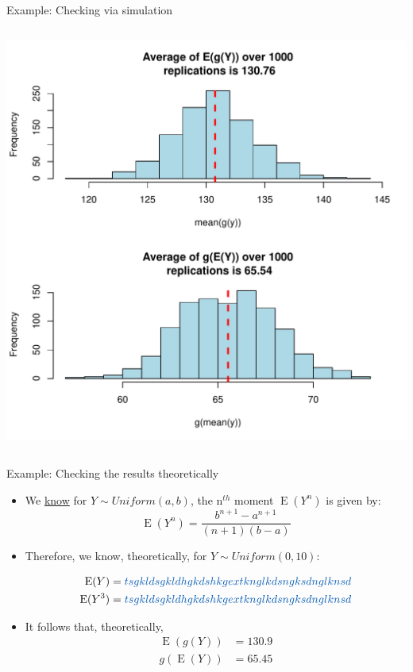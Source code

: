 \documentclass[10pt]{beamer}\usepackage[]{graphicx}\usepackage[]{color}
\makeatletter
\def\maxwidth{ %
  \ifdim\Gin@nat@width>\linewidth
    \linewidth
  \else
    \Gin@nat@width
  \fi
}
\newenvironment{knitrout}{}{} %
\newcommand{\Expec}{\operatorname{E}}
\makeatother
\begin{document}
\begin{frame}[fragile]{Example: Checking via simulation}
\begin{columns}
\begin{column}{0.5\textwidth}
\begin{knitrout}
{\centering \includegraphics[width=\maxwidth]{figure/unnamed-chunk-5-1} 

}


\end{knitrout}
\end{column}
\end{columns}
\end{frame}


\begin{frame}[fragile]{Example: Checking the results theoretically}
	\begin{itemize}
		\item We \href{https://en.wikipedia.org/wiki/Continuous_uniform_distribution#Moments}{know} for $Y \sim Uniform(a, b)$, the n$^{th}$ moment $\Expec(Y^n)$ is given by:
		$$
		\Expec(Y^n) = \frac{b^{n+1} - a^{n+1}}{(n+1)(b-a)}
		$$
		\pause
		\item Therefore, we know, theoretically, for $Y \sim Uniform(0, 10)$: 
		
		\begin{align}
		\Expec(Y) &= \textcolor{white}{tsgkldsgkldhgkdshkgextknglkdsngksdnglknsd} \\
		\Expec(Y^3) &= \textcolor{white}{tsgkldsgkldhgkdshkgextknglkdsngksdnglknsd}
		\end{align}
		\pause		
		\item It follows that, theoretically, 
		\begin{align}
			\Expec(g(Y)) & = 130.9\\
			g(\Expec(Y)) & = 65.45
		\end{align}
	\end{itemize}
\end{frame}
\end{document}
